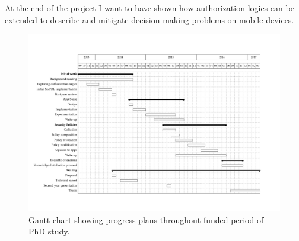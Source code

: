 \documentclass[a4paper,sfsidenotes]{tufte-book}
\begin{document}

At the end of the project I want to have shown how authorization logics can be
extended to describe and mitigate decision making problems on mobile devices.

\begin{figure}\label{fig:gantt}
  \includegraphics[width=1.4\linewidth,angle=90]{gantt.pdf}
  \caption{Gantt chart showing progress plans throughout funded period of PhD
  study.}
\end{figure}



\appendix

\end{document}
